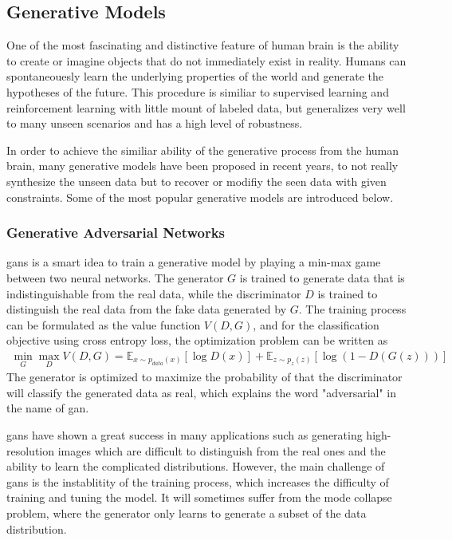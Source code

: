 \documentclass[12pt,DIV14,BCOR12mm,a4paper,footinclude=false,headinclude,parskip=half-,twoside,openright,cleardoublepage=empty,toc=index,bibliography=totoc,listof=totoc]{scrreprt}
\numberwithin{equation}{chapter}
\begin{document}
\subsection{Generative Models}
One of the most fascinating and distinctive feature of human brain is the ability to create or imagine objects that do not immediately exist in reality. Humans can spontaneouesly learn the underlying properties of the world and generate the hypotheses of the future. This procedure is similiar to supervised learning and reinforcement learning with little mount of labeled data, but generalizes very well to many unseen scenarios and has a high level of robustness\cite{lamb2021brief}.

In order to achieve the similiar ability of the generative process from the human brain, many generative models have been proposed in recent years, to not really synthesize the unseen data but to recover or modifiy the seen data with given constraints. Some of the most popular generative models are introduced below.

\subsubsection{Generative Adversarial Networks}
\glspl{gan} \cite{goodfellow2014generative} is a smart idea to train a generative model by playing a min-max game between two neural networks. The generator $G$ is trained to generate data that is indistinguishable from the real data, while the discriminator $D$ is trained to distinguish the real data from the fake data generated by $G$. The training process can be formulated as the value function $V(D,G)$, and for the classification objective using cross entropy loss, the optimization problem can be written as
\begin{align}
  \min_{G} \max_{D} V(D,G) = \mathbb{E}_{x\sim p_{data}(x)}[\log D(x)] + \mathbb{E}_{z\sim p_{z}(z)}[\log(1-D(G(z)))]
\end{align}
The generator is optimized to maximize the probability of that the discriminator will classify the generated data as real, which explains the word "adversarial" in the name of \gls{gan}.

\glspl{gan} have shown a great success in many applications such as generating high-resolution images which are difficult to distinguish from the real ones and the ability to learn the complicated distributions. However, the main challenge of \glspl{gan} is the instablitity of the training process, which increases the difficulty of training and tuning the model. It will sometimes suffer from the mode collapse problem, where the generator only learns to generate a subset of the data distribution\cite{borji2018pros}.
\end{document}
